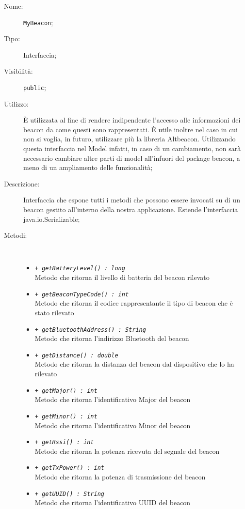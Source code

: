 \documentclass[../DefinizioneDiProdotto.tex]{subfiles}
\begin{document}
\begin{description}
	\item[Nome:] \texttt{MyBeacon};
	\item[Tipo:] Interfaccia;
	\item[Visibilità:] \texttt{public};
	\item[Utilizzo:] È utilizzata al fine di rendere indipendente l'accesso alle informazioni dei beacon da come questi sono rappresentati. È utile inoltre nel caso in cui non si voglia, in futuro, utilizzare più la libreria Altbeacon. Utilizzando questa interfaccia nel Model infatti, in caso di un cambiamento, non sarà necessario cambiare altre parti di model all'infuori del package beacon, a meno di un ampliamento delle funzionalità;
	\item[Descrizione:] Interfaccia che espone tutti i metodi che possono essere invocati su di un beacon gestito all'interno della nostra applicazione. Estende l'interfaccia java.io.Serializable;
	\item[Metodi:] \
	\begin{itemize}
		\item \texttt{+ \textit{getBatteryLevel() : long}}\\
		Metodo che ritorna il livello di batteria del beacon rilevato
		\item \texttt{+ \textit{getBeaconTypeCode() : int}}\\
		Metodo che ritorna il codice rappresentante il tipo di beacon che è stato rilevato
		\item \texttt{+ \textit{getBluetoothAddress() : String}}\\
		Metodo che ritorna l'indirizzo Bluetooth del beacon
		\item \texttt{+ \textit{getDistance() : double}}\\
		Metodo che ritorna la distanza del beacon dal dispositivo che lo ha rilevato
		\item \texttt{+ \textit{getMajor() : int}}\\
		Metodo che ritorna l'identificativo Major del beacon
		\item \texttt{+ \textit{getMinor() : int}}\\
		Metodo che ritorna l'identificativo Minor del beacon
		\item \texttt{+ \textit{getRssi() : int}}\\
		Metodo che ritorna la potenza ricevuta del segnale del beacon
		\item \texttt{+ \textit{getTxPower() : int}}\\
		Metodo che ritorna la potenza di trasmissione del beacon
		\item \texttt{+ \textit{getUUID() : String}}\\
		Metodo che ritorna l'identificativo UUID del beacon
	\end{itemize}
\end{description}
\end{document}
